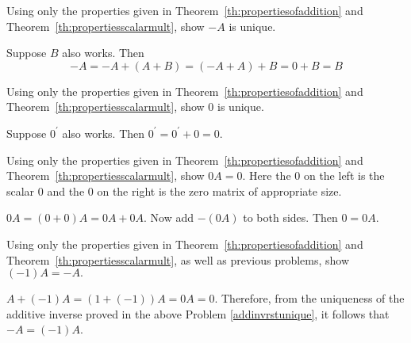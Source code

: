 \documentclass{ximera}
\begin{document}
\begin{problem}\label{prb:4.5} \label{addinvrstunique} Using only the properties given in Theorem~\ref{th:propertiesofaddition}
 and Theorem~\ref{th:propertiesscalarmult},
show $-A$ is unique.

\begin{hint}
 Suppose $B$ also works. Then
\[
-A=-A+\left( A+B\right) =\left( -A+A\right) +B=0+B=B
\]
\end{hint}
\end{problem}

\begin{problem}\label{prb:4.6} Using only the properties given in Theorem~\ref{th:propertiesofaddition}
 and Theorem~\ref{th:propertiesscalarmult},
show $0$ is unique.

\begin{hint}
Suppose $0^{\prime }$ also works. Then $0^{\prime }=0^{\prime }+0=0.$
\end{hint}
\end{problem}

\begin{problem}\label{prb:4.7} Using only the properties given in Theorem~\ref{th:propertiesofaddition}
 and Theorem~\ref{th:propertiesscalarmult}, show $0A=0.$ Here
the $0$ on the left is the scalar $0$ and the $0$ on the right is the zero matrix of appropriate size.

\begin{hint}
$0A=\left( 0+0\right) A=0A+0A.$ Now add $-\left(
0A\right) $ to both sides. Then $0=0A$.
\end{hint}
\end{problem}

\begin{problem}\label{prb:4.8} Using only the properties given in Theorem~\ref{th:propertiesofaddition}
 and Theorem~\ref{th:propertiesscalarmult}, as well as previous
problems, show $\left( -1\right) A=-A.$

\begin{hint}
$A+\left( -1\right) A=\left( 1+\left(
-1\right) \right) A=0A=0.$ Therefore, from the uniqueness of the additive
inverse proved in the above Problem \ref{addinvrstunique}, it follows that $
-A=\left( -1\right) A$.
\end{hint}
\end{problem}
\end{document}
